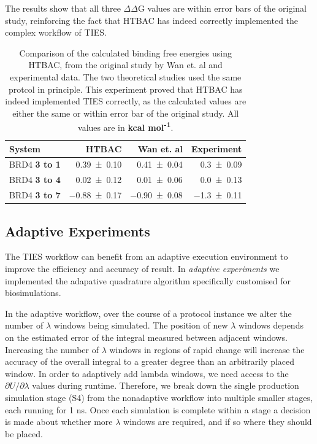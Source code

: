 The results show that all three $\Delta \Delta$G values are within error bars
of the original study, reinforcing the fact that HTBAC has indeed correctly
implemented the complex workflow of TIES.

\begin{table}
  \centering
  \begin{tabular}{l@{\hskip 1in}r@{\hskip 0.2in}r@{\hskip 0.2in}r}
    \toprule
    System & HTBAC & Wan et. al & Experiment \\
    \midrule
    BRD4 \textbf{3 to 1} & \num{0.39 +- 0.10} &   \num{0.41 +- 0.04} &  \num{0.3 +- 0.09} \\
    BRD4 \textbf{3 to 4} & \num{0.02 +- 0.12} &   \num{0.01 +- 0.06} &  \num{0.0 +- 0.13} \\
    BRD4 \textbf{3 to 7} & \num{-0.88 +- 0.17} &  \num{-0.90 +- 0.08} & \num{-1.3 +- 0.11} \\
    \bottomrule
  \end{tabular}

  \caption{Comparison of the calculated binding free energies using HTBAC, from
  the original study by Wan et. al and experimental data. The two theoretical
  studies used the same protcol in principle. This experiment proved that HTBAC
  has indeed implemented TIES correctly, as the calculated values are either
  the same or within error bar of the original study. All values are in
  \textbf{kcal mol\textsuperscript{-1}}.}
  \label{tab:exp2}


\end{table}


\subsection{Adaptive Experiments}

The TIES workflow can benefit from an adaptive execution environment to improve
the efficiency and accuracy of result. In \emph{adaptive experiments} we
implemented the adapative quadrature algorithm specifically customised for
biosimulations.

In the adaptive workflow, over the course of a protocol instance we alter
the number of $\lambda$ windows being simulated. The position of new $\lambda$
windows depends on the estimated error of the integral measured between
adjacent windows. Increasing the number of $\lambda$ windows in regions of
rapid change will increase the accuracy of the overall integral to a greater
degree than an
arbitrarily placed window. In order to adaptively add lambda windows, we need
access to the $\partial U/\partial\lambda$ values during runtime. Therefore, we break down the
single production simulation stage (S4) from the nonadaptive workflow into
multiple smaller stages, each running for 1 ns. Once each simulation is
complete within a stage a decision is made about whether more $\lambda$ windows
are required, and if so where they should be placed.

